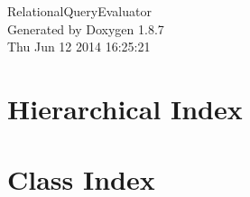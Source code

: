 \documentclass[twoside]{book}
\newcommand{\+}{\discretionary{\mbox{\scriptsize$\hookleftarrow$}}{}{}}
\newcommand{\clearemptydoublepage}{%
  \newpage{\pagestyle{empty}\cleardoublepage}%
}
\begin{document}
\hypersetup{pageanchor=false,
             bookmarks=true,
             bookmarksnumbered=true,
             pdfencoding=unicode
            }
\begin{titlepage}
\vspace*{7cm}
\begin{center}%
{\Large Relational\+Query\+Evaluator }\\
\vspace*{1cm}
{\large Generated by Doxygen 1.8.7}\\
\vspace*{0.5cm}
{\small Thu Jun 12 2014 16:25:21}\\
\end{center}
\end{titlepage}
\clearemptydoublepage
\tableofcontents
\clearemptydoublepage
{}
\hypersetup{pageanchor=true}

\chapter{Hierarchical Index}

\chapter{Class Index}

\end{document}
